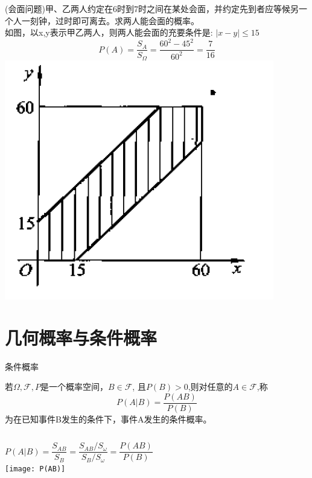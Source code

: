 \begin{frame}
\begin{example}
	(会面问题)甲、乙两人约定在6时到7时之间在某处会面，并约定先到者应等候另一个人一刻钟，过时即可离去。求两人能会面的概率。\\
	如图，以x,y表示甲乙两人，则两人能会面的充要条件是: $|x-y|\leq 15$\\
	$$P(A)=\frac{S_A}{S_\Omega}=\frac{60^2-45^2}{60^2}=\frac{7}{16}$$
	\includegraphics[scale=0.4]{geometry1}
\end{example}
\end{frame}

\section{几何概率与条件概率}

\begin{frame}{条件概率}
\begin{definition}
	若$\Omega,\mathcal{F},P$是一个概率空间，$B\in\mathcal{F}$, 且$P(B)>0$,则对任意的$A\in\mathcal{F}$,称
	$$P(A|B)=\frac{P(AB)}{P(B)}$$
	为在已知事件B发生的条件下，事件A发生的条件概率。
\end{definition}

\begin{columns}%
\[P(A|B)=\frac{S_{AB}}{S_B}=\frac{S_{AB}/S_\omega}{S_B/S_\omega}=\frac{P(AB)}{P(B)} \]
\texttt{[image: P(AB)]}
\end{columns}
\end{frame}


